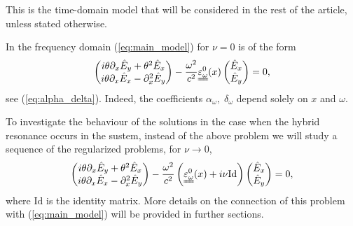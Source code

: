{This is the time-domain model that will be considered in the rest of the article, unless stated otherwise. 

In the frequency domain (\ref{eq:main_model}) for $\nu=0$ is of the form 
\begin{align}
\label{eq:main_frequency_domain_intro}
\left(
\begin{matrix}
 i\theta \partial_x \hat{E}_y+\theta^2 \hat{E}_x\\
 i\theta \partial_x \hat{E}_x -\partial_x^2 \hat{E}_y
\end{matrix}
\right)-\frac{\omega^2}{c^2}
\uuline{\varepsilon_{\omega}^{0}}(x)\left(
\begin{matrix}
 \hat{E}_x\\
 \hat{E}_y
\end{matrix}
\right)
=0,
\end{align}
see (\ref{eq:alpha_delta}). Indeed, the coefficients $\alpha_{\omega},\;\delta_{\omega}$ depend solely on $x$ and $\omega$.  

To investigate the behaviour of the solutions in the case when the hybrid resonance occurs in the sustem, 
instead of the above problem we will study a sequence of the regularized problems, for $\nu\rightarrow 0$, 
\begin{align}
\label{eq:seq_regularized}
\left(
\begin{matrix}
 i\theta \partial_x \hat{E}_y+\theta^2 \hat{E}_x\\
 i\theta \partial_x \hat{E}_x -\partial_x^2 \hat{E}_y
\end{matrix}
\right)-\frac{\omega^2}{c^2}
\left(\uuline{\varepsilon_{\omega}^{0}}(x)+i\nu \mathrm{Id}\right)\left(
\begin{matrix}
 \hat{E}_x\\
 \hat{E}_y
\end{matrix}
\right)
=0,
\end{align}
where $\mathrm{Id}$ is the identity matrix. More details on the connection of this problem with (\ref{eq:main_model}) will be provided in further sections. 

}
